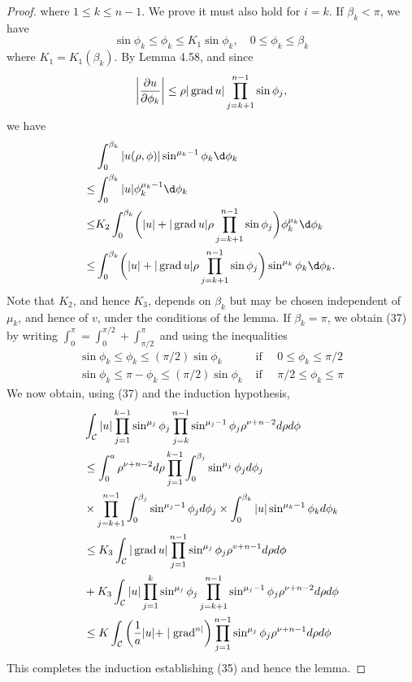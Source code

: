 \begin{proof}
  where $1 \leq k \leq n-1$. We prove it must also hold for $i=k$.
  If $\beta_k<\pi$, we have
  \[
  \sin \phi_k \leq \phi_k \leq K_1 \sin \phi_k, \quad 0 \leq \phi_k \leq \beta_k
  \]
  where $K_1=K_1\left(\beta_k\right)$. By Lemma 4.58, and since
  \[
  \left|\frac{\partial u}{\partial \phi_k}\right| \leq \rho|\operatorname{grad} u| \prod_{j=k+1}^{n-1} \sin \phi_j,
  \]
  we have
  \begin{align*}
    & \int_0^{\beta_k} |u(\rho,\phi)| \sin^{\mu_k-1} \phi_k \d \phi_k \\
    \leq & \int_0^{\beta_k} |u| \phi_k^{\mu_k-1} \d \phi_k \\
    \leq & K_2 \int_0^{\beta_k} \biggl(|u| 
      + |\grad u| \rho \prod_{j=k+1}^{n-1} \sin\phi_j\biggr) \phi_k^{\mu_k} \d \phi_k \\
    \leq & \int_{0}^{\beta_k} \biggl(|u| 
      + |\grad u| \rho \prod_{j=k+1}^{n-1} \sin\phi_j\biggr) \sin^{\mu_k} \phi_k \d \phi_k.
  \end{align*}
  Note that $K_2$, and hence $K_3$, depends on $\beta_k$ but may be chosen independent of $\mu_k$,
  and hence of $v$, under the conditions of the lemma.
  If $\beta_k=\pi$, we obtain (37) by writing $\int_0^\pi=\int_0^{\pi / 2}+\int_{\pi / 2}^\pi$
  and using the inequalities
  \[
  \begin{array}{ll}
  \sin \phi_k \leq \phi_k \leq(\pi / 2) \sin \phi_k & \text { if } \quad 0 \leq \phi_k \leq \pi / 2 \\
  \sin \phi_k \leq \pi-\phi_k \leq(\pi / 2) \sin \phi_k & \text { if } \quad \pi / 2 \leq \phi_k \leq \pi
  \end{array}
  \]
  We now obtain, using (37) and the induction hypothesis,
  \[
  \begin{aligned}
  & \int_{\mathcal{C}}|u| \prod_{j=1}^{k-1} \sin ^{\mu_j} \phi_j \prod_{j=k}^{n-1} \sin ^{\mu_j-1} \phi_j \rho^{\nu+n-2} d \rho d \phi \\
  & \leq \int_0^a \rho^{\nu+n-2} d \rho \prod_{j=1}^{k-1} \int_0^{\beta_j} \sin ^{\mu_j} \phi_j d \phi_j \\
  & \times \prod_{j=k+1}^{n-1} \int_0^{\beta_j} \sin ^{\mu_j-1} \phi_j d \phi_j \times \int_0^{\beta_k}|u| \sin ^{\mu_k-1} \phi_k d \phi_k \\
  & \leq K_3 \int_{\mathcal{C}}|\operatorname{grad} u| \prod_{j=1}^{n-1} \sin ^{\mu_j} \phi_j \rho^{v+n-1} d \rho d \phi \\
  &+K_3 \int_{\mathcal{C}}|u| \prod_{j=1}^k \sin ^{\mu_j} \phi_j \prod_{j=k+1}^{n-1} \sin ^{\mu_j-1} \phi_j \rho^{\nu+n-2} d \rho d \phi \\
  & \leq K \int_{\mathcal{C}}\left(\frac{1}{a}|u|+\mid \operatorname{grad}^{n \mid}\right) \prod_{j=1}^{n-1} \sin ^{\mu_j} \phi_j \rho^{\nu+n-1} d \rho d \phi
  \end{aligned}
  \]
  This completes the induction establishing (35) and hence the lemma.
\end{proof}

